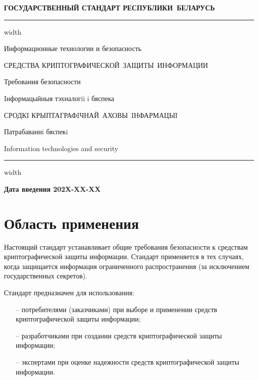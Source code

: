 \newpage
\setcounter{page}{1}
\pagestyle{headings}

\begin{center}
{\bfseries
ГОСУДАРСТВЕННЫЙ СТАНДАРТ РЕСПУБЛИКИ~БЕЛАРУСЬ
\vskip 2pt
\hrule width\textwidth

\vskip 9pt

Информационные технологии и безопасность

СРЕДСТВА КРИПТОГРАФИЧЕСКОЙ~ЗАЩИТЫ~ИНФОРМАЦИИ

Требования безопасности

\vskip 9pt

Iнформацыйныя тэхналогii i бяспека

СРОДКI КРЫПТАГРАФIЧНАЙ~АХОВЫ~IНФАРМАЦЫI

Патрабаваннi бяспекi
}

\vskip 9pt

Information technologies and security



\vskip 4pt                
\hrule width \textwidth
\end{center}

\mbox{}\hfill{\bfseries Дата введения 202X-XX-XX}

\chapter{Область применения}\label{SCOPE}

Настоящий стандарт устанавливает общие требования безопасности к средствам
криптографической защиты информации. Стандарт применяется в тех 
случаях, когда защищается информация ограниченного распространения (за 
исключением государственных секретов).

Стандарт предназначен для использования:
\begin{itemize}
\item[--]
потребителями (заказчиками) при выборе и применении средств криптографической
защиты информации;

\item[--]
разработчиками при создании средств криптографической защиты информации;

\item[--]
экспертами при оценке надежности средств криптографической защиты 
информации. 
\end{itemize}



